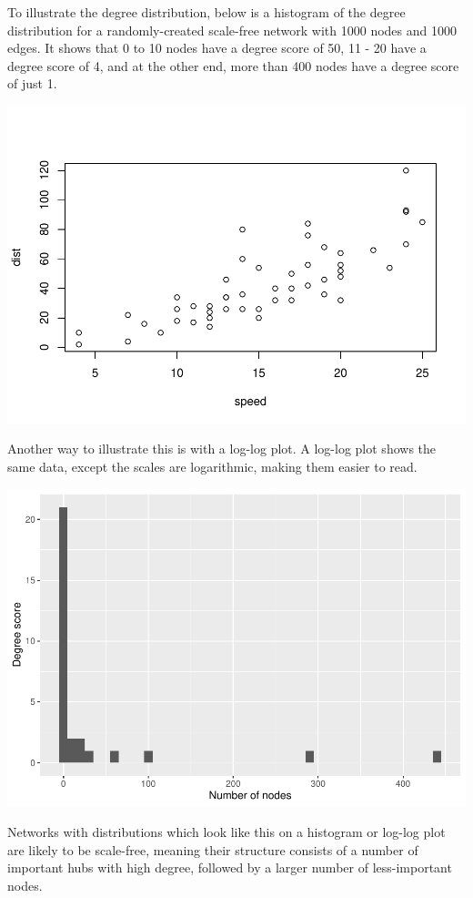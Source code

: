 \documentclass[
]{book}
\begin{document}
To illustrate the degree distribution, below is a histogram of the degree distribution for a randomly-created scale-free network with 1000 nodes and 1000 edges. It shows that 0 to 10 nodes have a degree score of 50, 11 - 20 have a degree score of 4, and at the other end, more than 400 nodes have a degree score of just 1.

\includegraphics{_main_files/figure-latex/unnamed-chunk-32-1.pdf}

Another way to illustrate this is with a log-log plot. A log-log plot shows the same data, except the scales are logarithmic, making them easier to read.

\includegraphics{_main_files/figure-latex/unnamed-chunk-33-1.pdf}

Networks with distributions which look like this on a histogram or log-log plot are likely to be scale-free, meaning their structure consists of a number of important hubs with high degree, followed by a larger number of less-important nodes.
\end{document}
